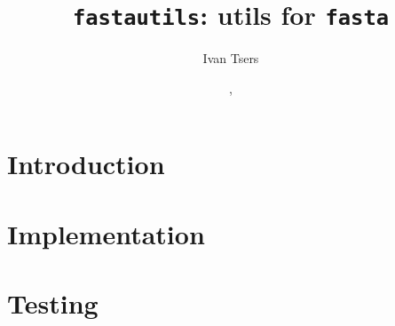 \documentclass[a4paper]{article}
\begin{document}
\pagestyle{noweb}

\title{\texttt{fastautils}: utils for \texttt{fasta}}
\author{Ivan Tsers}
\date{, }
\maketitle

\tableofcontents

\section{Introduction}

\section{Implementation}

\section{Testing}

\end{document}
